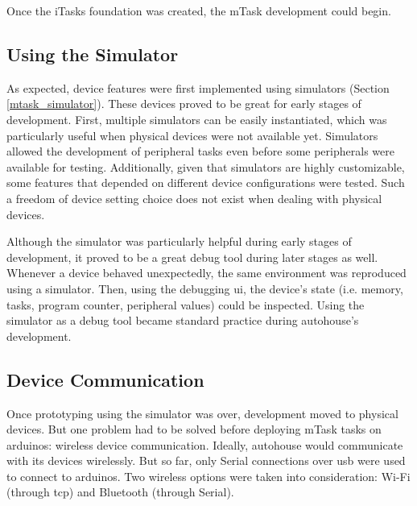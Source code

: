 Once the \gls{iTasks} foundation was created, the \gls{mTask} development could begin.

\subsection{Using the Simulator}
As expected, device features were first implemented using simulators (Section \ref{mtask_simulator}). These devices proved to be great for early stages of development. First, multiple simulators can be easily instantiated, which was particularly useful when physical devices were not available yet. Simulators allowed the development of peripheral tasks even before some peripherals were available for testing. Additionally, given that simulators are highly customizable, some features that depended on different device configurations were tested. Such a freedom of device setting choice does not exist when dealing with physical devices. 

Although the simulator was particularly helpful during early stages of development, it proved to be a great debug tool during later stages as well. Whenever a device behaved unexpectedly, the same environment was reproduced using a simulator. Then, using the debugging \acs{ui}, the device's state (i.e. memory, tasks, program counter, peripheral values) could be inspected. Using the simulator as a debug tool became standard practice during \gls{autohouse}'s development.

\subsection{Device Communication}
Once prototyping using the simulator was over, development moved to physical devices. But one problem had to be solved before deploying \gls{mTask} tasks on \gls{arduino}s: wireless device communication. Ideally, \gls{autohouse} would communicate with its devices wirelessly. But so far, only Serial connections over \acs{usb} were used to connect to \gls{arduino}s. Two wireless options were taken into consideration: Wi-Fi (through \acs{tcp}) and Bluetooth (through Serial).

